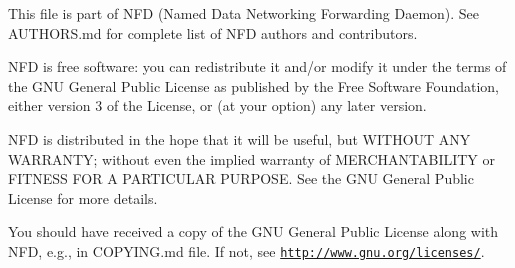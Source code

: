 This file is part of N\+FD (Named Data Networking Forwarding Daemon). See A\+U\+T\+H\+O\+R\+S.\+md for complete list of N\+FD authors and contributors.

N\+FD is free software\+: you can redistribute it and/or modify it under the terms of the G\+NU General Public License as published by the Free Software Foundation, either version 3 of the License, or (at your option) any later version.

N\+FD is distributed in the hope that it will be useful, but W\+I\+T\+H\+O\+UT A\+NY W\+A\+R\+R\+A\+N\+TY; without even the implied warranty of M\+E\+R\+C\+H\+A\+N\+T\+A\+B\+I\+L\+I\+TY or F\+I\+T\+N\+E\+SS F\+OR A P\+A\+R\+T\+I\+C\+U\+L\+AR P\+U\+R\+P\+O\+SE. See the G\+NU General Public License for more details.

You should have received a copy of the G\+NU General Public License along with N\+FD, e.\+g., in C\+O\+P\+Y\+I\+N\+G.\+md file. If not, see \href{http://www.gnu.org/licenses/}{\tt http\+://www.\+gnu.\+org/licenses/}. 